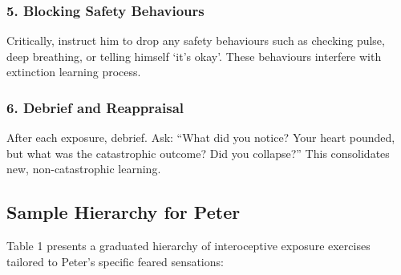 \documentclass[
  american,
  letterpaper,
  DIV=11,
  numbers=noendperiod]{scrartcl}
\begin{document}
\subsubsection{5. Blocking Safety
Behaviours}\label{blocking-safety-behaviours}

Critically, instruct him to drop any safety behaviours such as checking
pulse, deep breathing, or telling himself `it's okay'. These behaviours
interfere with extinction learning process.

\subsubsection{6. Debrief and
Reappraisal}\label{debrief-and-reappraisal}

After each exposure, debrief. Ask: ``What did you notice? Your heart
pounded, but what was the catastrophic outcome? Did you collapse?'' This
consolidates new, non-catastrophic learning.

\subsection{Sample Hierarchy for
Peter}\label{sample-hierarchy-for-peter}

Table 1 presents a graduated hierarchy of interoceptive exposure
exercises tailored to Peter's specific feared sensations:
\end{document}
